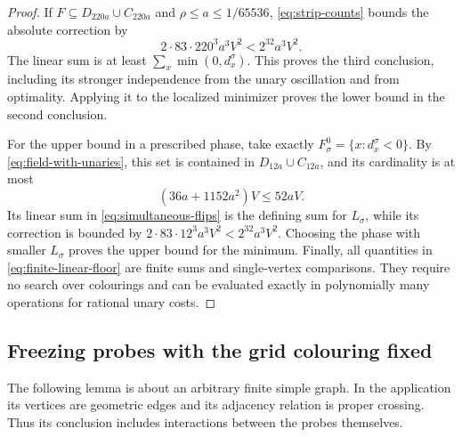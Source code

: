 \begin{proof}
If $F\subseteq D_{220a}\cup C_{220a}$ and
$\rho\le a\le1/65536$, \eqref{eq:strip-counts} bounds the absolute
correction by
\[
 2\cdot83\cdot220^3a^3V^2<2^{32}a^3V^2.
\]
The linear sum is at least $\sum_x\min(0,d_x^\sigma)$.
This proves the third conclusion, including its stronger independence
from the unary oscillation and from optimality.  Applying it to the
localized minimizer proves the lower bound in the second conclusion.

For the upper bound in a prescribed phase, take exactly
$F_\sigma^0=\{x:d_x^\sigma<0\}$.  By
\eqref{eq:field-with-unaries}, this set is contained in
$D_{12a}\cup C_{12a}$, and its cardinality is at most
\[
 (36a+1152a^2)V\le52aV.
\]
Its linear sum in \eqref{eq:simultaneous-flips} is the defining sum for
$L_\sigma$, while its correction is bounded by
$2\cdot83\cdot12^3a^3V^2<2^{32}a^3V^2$.
Choosing the phase with smaller $L_\sigma$ proves the upper bound for
the minimum.  Finally, all quantities in \eqref{eq:finite-linear-floor}
are finite sums and single-vertex comparisons.  They require no search
over colourings and can be evaluated exactly in polynomially many
operations for rational unary costs.
\end{proof}

\subsection{Freezing probes with the grid colouring fixed}

The following lemma is about an arbitrary finite simple graph.  In the
application its vertices are geometric edges and its adjacency relation
is proper crossing.  Thus its conclusion includes interactions between
the probes themselves.

